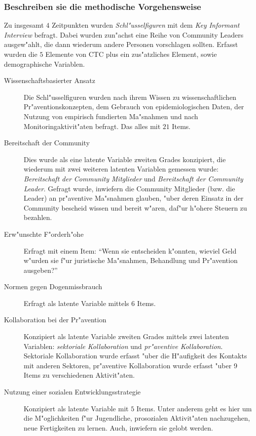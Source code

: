 \subsubsection{Beschreiben sie die methodische Vorgehensweise}

Zu insgesamt $4$ Zeitpunkten wurden \emph{Schl"usselfiguren} mit dem \emph{Key Informant Interview} befragt. Dabei wurden zun"achst eine Reihe von Community Leaders ausgew"ahlt, die dann wiederum andere Personen vorschlagen sollten. Erfasst wurden die $5$ Elemente von CTC plus ein zus"atzliches Element, sowie demographische Variablen.

\begin{description}
        \item[Wissenschaftsbasierter Ansatz] Die Schl"usselfiguren wurden nach ihrem Wissen zu wissenschaftlichen Pr"aventionskonzepten, dem Gebrauch von epidemiologischen Daten, der Nutzung von empirisch fundierten Ma"snahmen und nach Monitoringaktivit"aten befragt. Das alles mit $21$ Items.
        \item[Bereitschaft der Community] Dies wurde als eine latente Variable zweiten Grades konzipiert, die wiederum mit zwei weiteren latenten Variablen gemessen wurde: \emph{Bereitschaft der Community Mitglieder} und \emph{Bereitschaft der Community Leader}. Gefragt wurde, inwiefern die Community Mitglieder (bzw. die Leader) an pr"aventive Ma"snahmen glauben, "uber deren Einsatz in der Community bescheid wissen und bereit w"aren, daf"ur h"ohere Steuern zu bezahlen. 
        \item[Erw"unschte F"orderh"ohe] Erfragt mit einem Item: ``Wenn sie entscheiden k"onnten, wieviel Geld w"urden sie f"ur juristische Ma"snahmen, Behandlung und Pr"avention ausgeben?''
        \item[Normen gegen Dogenmissbrauch] Erfragt als latente Variable mittels $6$ Items.
        \item[Kollaboration bei der Pr"avention] Konzipiert als latente Variable zweiten Grades mittels zwei latenten Variablen: \emph{sektoriale Kollaboration} und \emph{pr"aventive Kollaboration}. Sektoriale Kollaboration wurde erfasst "uber die H"aufigkeit des Kontakts mit anderen Sektoren, pr"aventive Kollaboration wurde erfasst "uber 9 Items zu verschiedenen Aktivit"aten.
        \item[Nutzung einer sozialen Entwicklungsstrategie] Konzipiert als latente Variable mit $5$ Items. Unter anderem geht es hier um die M"oglichkeiten f"ur Jugendliche, prosozialen Aktivit"aten nachzugehen, neue Fertigkeiten zu lernen. Auch, inwiefern sie gelobt werden. 
\end{description}

